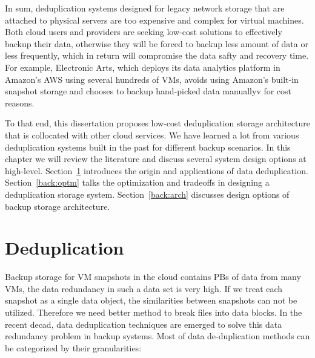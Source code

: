 In sum, deduplication systems designed for legacy network storage that are attached to
physical servers are too expensive and complex for virtual machines. 
Both cloud users and providers are seeking low-cost solutions to effectively backup
their data, otherwise they will be forced to backup less amount of data or less frequently,
which in return will compromise the data safty and recovery time. For example, Electronic Arts, which deploys
its data analytics platform in Amazon's AWS using several hundreds of VMs, 
avoids using Amazon's built-in snapshot storage and chooses to backup hand-picked data manuallyv for cost reasons.

To that end, this dissertation proposes low-cost deduplication storage architecture that is
collocated with other cloud services. We have learned a lot from 
various deduplication systems built in the past for different backup scenarios. 
In this chapter we will review the literature and discuss several system design options at high-level.
Section~\ref{back:dedup} introduces the origin and applications of data deduplication.
Section~\ref{back:optm} talks the optimization and tradeoffs in designing a deduplication storage system.
Section~\ref{back:arch} discusses design options of backup storage architecture.

\section{Deduplication}
\label{back:dedup}
Backup storage for VM snapshots in the cloud contains PBs of data from many VMs,
the data redundancy in such a data set is very high\cite{Jayaram2011, agrawal07}.
If we treat each snapshot as a single data object, the similarities between snapshots
can not be utilized. Therefore we need better method to break files into data blocks.
In the recent decad, data deduplication techniques are emerged to solve this data
redundancy problem in backup systems.
Most of data de-duplication methods can be categorized by their granularities:

